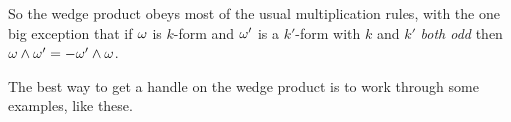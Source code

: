 %
%

\noindent
So the wedge product obeys most of the usual multiplication rules, with
the one big exception that if $\omega$ is $k$-form and $\omega'$ is a 
$k'$-form with $k$ and $k'$  \emph{both odd} then $\omega\wedge\omega'=-\omega'\wedge\omega$. 

The best way to get a handle on
the wedge product is to work through some examples, like these.

